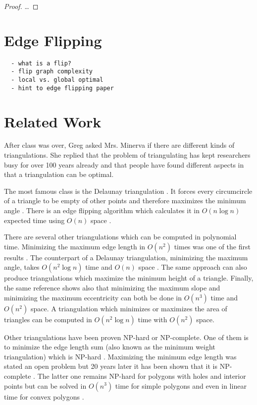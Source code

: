 \begin{proof}
  \ldots{}
\end{proof}

\section{Edge Flipping}
\begin{verbatim}
  - what is a flip?
  - flip graph complexity
  - local vs. global optimal
  - hint to edge flipping paper
\end{verbatim}

\section{Related Work}
After class was over, Greg asked Mrs. Minerva if there are different
kinds of triangulations. She replied that the problem of 
triangulating has kept researchers busy for over 100 years already
\cite{triangulation_hilbert} and that people have found different
aspects in that a triangulation can be optimal.

The most famous class is the Delaunay triangulation
\cite[Section 9.2]{deberg_compgeom}. It forces every circumcircle
of a triangle to be empty of other points and therefore maximizes
the minimum angle \cite[Theorem 9.9]{deberg_compgeom}. There is an
edge flipping algorithm which calculates it in \(O(n \log n)\) 
expected time using \(O(n)\) space 
\cite[Theorem 9.12]{deberg_compgeom}.

There are several other triangulations which can be computed in
polynomial time. Minimizing the maximum edge length in \(O(n^2)\)
times was one of the first results \cite{triangulation_minmax_length}.
The counterpart of a Delaunay triangulation, 
minimizing the maximum angle, takes \(O(n^2 \log n)\) time and
\(O(n)\) space \cite{triangulation_edge_insertion}. The same
approach can also produce triangulations which maximize the minimum 
height of a triangle. Finally, the same reference shows also that 
minimizing the maximum slope and minimizing the maximum eccentricity 
can both be done in \(O(n^3)\) time and \(O(n^2)\) space. A 
triangulation which minimizes or maximizes the area of triangles can
be computed in \(O(n^2 \log n)\) time with \(O(n^2)\) space.
\cite{triangulation_area}

Other triangulations have been proven NP-hard or NP-complete. One
of them is to minimize the edge length sum (also known as the minimum
weight triangulation) which is NP-hard \cite{mwt_complexity}. 
Maximizing the minimum edge length was stated an open problem
\cite{triangulation_minmax_length} but 20 years later it has been
shown that it is NP-complete \cite{mmlt_complexity}. The latter one
remains NP-hard for polygons with holes and interior points
\cite{mmlt_polygons} but can be solved in \(O(n^3)\) time for simple
polygons and even in linear time for convex polygons
\cite{mmlt_convex_polygons}.


